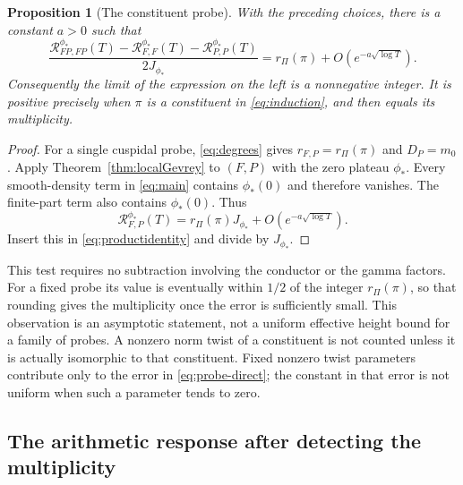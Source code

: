 \documentclass[11pt]{article}
\numberwithin{equation}{section}
\newtheorem{proposition}[theorem]{Proposition}
\theoremstyle{remark}
\begin{document}
\begin{proposition}[The constituent probe]\label{prop:constituent-probe}
With the preceding choices, there is a constant $a>0$ such that
\begin{equation}\label{eq:probe-direct}
 \frac{\mathcal R^{\phi_*}_{FP,FP}(T)
       -\mathcal R^{\phi_*}_{F,F}(T)
       -\mathcal R^{\phi_*}_{P,P}(T)}{2J_{\phi_*}}
 =r_\Pi(\pi)+O\!\left(e^{-a\sqrt{\log T}}\right).
\end{equation}
Consequently the limit of the expression on the left is a nonnegative
integer.  It is positive precisely when $\pi$ is a constituent in
\eqref{eq:induction}, and then equals its multiplicity.
\end{proposition}

\begin{proof}
For a single cuspidal probe, \eqref{eq:degrees} gives
$r_{F,P}=r_\Pi(\pi)$ and $D_P=m_0$.  Apply
Theorem~\ref{thm:localGevrey} to $(F,P)$ with the zero plateau $\phi_*$.
Every smooth-density term in \eqref{eq:main} contains $\phi_*(0)$ and
therefore vanishes.  The finite-part term also contains $\phi_*(0)$.
Thus
\[
 \mathcal R^{\phi_*}_{F,P}(T)
 =r_\Pi(\pi)J_{\phi_*}
       +O\!\left(e^{-a\sqrt{\log T}}\right).
\]
Insert this in \eqref{eq:productidentity} and divide by $J_{\phi_*}$.
\end{proof}

This test requires no subtraction involving the conductor or the gamma
factors.  For a fixed probe its value is eventually within $1/2$ of the
integer $r_\Pi(\pi)$, so that rounding gives the multiplicity once the
error is sufficiently small.  This observation is an asymptotic
statement, not a uniform effective height bound for a family of probes.
A nonzero norm twist of a constituent is not counted unless it is
actually isomorphic to that constituent.  Fixed nonzero twist
parameters contribute only to the error in \eqref{eq:probe-direct}; the
constant in that error is not uniform when such a parameter tends to
zero.

\subsection{The arithmetic response after detecting the multiplicity}
\end{document}
